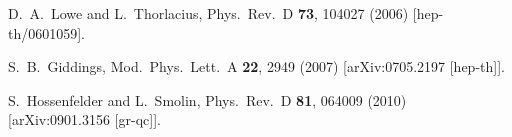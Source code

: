 \documentclass[11pt,twoside]{article}
\begin{document}
\begin{thebibliography}{99}
  D.~A.~Lowe and L.~Thorlacius,
  Phys.\ Rev.\ D {\bf 73}, 104027 (2006)
  [hep-th/0601059].

  S.~B.~Giddings,
  Mod.\ Phys.\ Lett.\ A {\bf 22}, 2949 (2007)
  [arXiv:0705.2197 [hep-th]].

  S.~Hossenfelder and L.~Smolin,
  Phys.\ Rev.\ D {\bf 81}, 064009 (2010)
  [arXiv:0901.3156 [gr-qc]].
\end{thebibliography}
\end{document}
